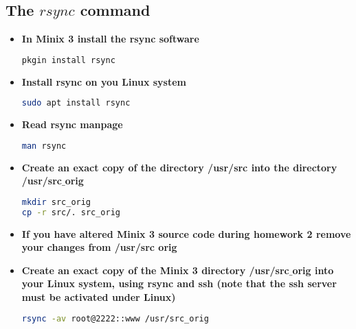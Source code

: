 \documentclass{article}
\begin{document}
\begin{spacing}{2}
\subsection{The $rsync$ command}
\begin{itemize}
\item \textbf{In Minix 3 install the rsync software}
\begin{lstlisting}[language=bash]
pkgin install rsync
\end{lstlisting}
\item \textbf{Install rsync on you Linux system}
\begin{lstlisting}[language=bash]
sudo apt install rsync
\end{lstlisting}
\item \textbf{Read rsync manpage}
\begin{lstlisting}[language=bash]
man rsync
\end{lstlisting}
\item \textbf{Create an exact copy of the directory /usr/src into the directory /usr/src$\_$orig}
\begin{lstlisting}[language=bash]
mkdir src_orig
cp -r src/. src_orig
\end{lstlisting}
\item \textbf{If you have altered Minix 3 source code during homework 2 remove your changes from /usr/src orig}
\item \textbf{Create an exact copy of the Minix 3 directory /usr/src$\_$orig into your Linux system, using rsync and ssh (note that the ssh server must be activated under Linux)}
\begin{lstlisting}[language=bash]
rsync -av root@2222::www /usr/src_orig
\end{lstlisting}
\end{itemize}

\end{spacing}
\end{document}
